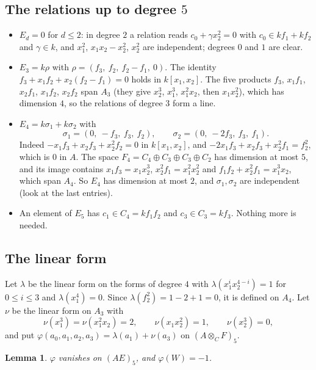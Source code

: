 \documentclass[11pt,a4paper]{amsart}
\newtheorem{lemma}[theorem]{Lemma}
\theoremstyle{remark}
\begin{document}
\subsection{The relations up to degree $5$}
\begin{itemize}
\item $E_d = 0$ for $d \le 2$: in degree $2$ a relation reads $c_0 + \gamma x_2^2 = 0$ with $c_0 \in kf_1 + kf_2$ and $\gamma \in k$, and $x_1^2$, $x_1x_2 - x_2^2$, $x_2^2$ are independent; degrees $0$ and $1$ are clear.
\item $E_3 = k\rho$ with $\rho = (f_3,\ f_2,\ f_2 - f_1,\ 0)$. The identity $f_3 + x_1f_2 + x_2(f_2 - f_1) = 0$ holds in $k[x_1, x_2]$. The five products $f_3$, $x_1f_1$, $x_2f_1$, $x_1f_2$, $x_2f_2$ span $A_3$ (they give $x_2^3$, $x_1^3$, $x_1^2x_2$, then $x_1x_2^2$), which has dimension $4$, so the relations of degree $3$ form a line.
\item $E_4 = k\sigma_1 + k\sigma_2$ with
\[
\sigma_1 = (0,\ -f_3,\ f_3,\ f_2), \qquad \sigma_2 = (0,\ -2f_3,\ f_3,\ f_1).
\]
Indeed $-x_1f_3 + x_2f_3 + x_2^2f_2 = 0$ in $k[x_1, x_2]$, and $-2x_1f_3 + x_2f_3 + x_2^2f_1 = f_2^2$, which is $0$ in $A$. The space $F_4 = C_4 \oplus C_3 \oplus C_3 \oplus C_2$ has dimension at most $5$, and its image contains $x_1f_3 = x_1x_2^3$, $x_2^2f_1 = x_1^2x_2^2$ and $f_1f_2 + x_2^2f_1 = x_1^3x_2$, which span $A_4$. So $E_4$ has dimension at most $2$, and $\sigma_1, \sigma_2$ are independent (look at the last entries).
\item An element of $E_5$ has $c_1 \in C_4 = kf_1f_2$ and $c_3 \in C_3 = kf_3$. Nothing more is needed.
\end{itemize}

\subsection{The linear form}
Let $\lambda$ be the linear form on the forms of degree $4$ with $\lambda(x_1^ix_2^{4-i}) = 1$ for $0 \le i \le 3$ and $\lambda(x_1^4) = 0$. Since $\lambda(f_2^2) = 1 - 2 + 1 = 0$, it is defined on $A_4$. Let $\nu$ be the linear form on $A_3$ with
\[
\nu(x_1^3) = \nu(x_1^2x_2) = 2, \qquad \nu(x_1x_2^2) = 1, \qquad \nu(x_2^3) = 0,
\]
and put $\varphi(a_0, a_1, a_2, a_3) = \lambda(a_1) + \nu(a_3)$ on $(A \otimes_C F)_5$.

\begin{lemma}\label{lem:form}
$\varphi$ vanishes on $(AE)_5$, and $\varphi(W) = -1$.
\end{lemma}
\end{document}
